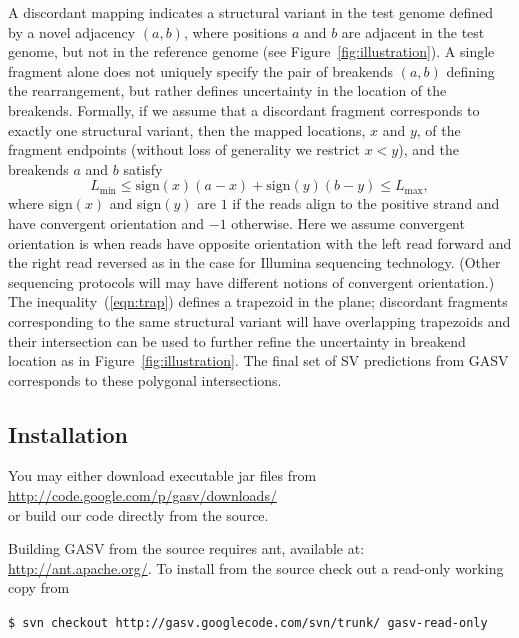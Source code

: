 \documentclass[11pt]{article}
\begin{document}
A discordant mapping indicates a structural variant in the test genome defined by a novel adjacency $(a,b)$, where positions $a$ and $b$ are adjacent in the test genome, but not in the reference genome (see Figure~\ref{fig:illustration}). A single fragment alone does not uniquely specify the pair of breakends $(a,b)$ defining the rearrangement, but rather defines uncertainty in the location of the breakends. Formally, if we assume that a discordant fragment corresponds to exactly one structural variant, then the mapped locations, $x$ and $y$, of the fragment endpoints (without loss of generality we restrict $x < y$), and the breakends $a$ and $b$ satisfy
\begin{equation}
L_{\min} \le \text{sign}(x)(a - x) + \text{sign}(y) (b - y) \le L_{\max}, \nonumber
\label{eqn:trap}
\end{equation}
\noindent where sign$(x)$ and sign$(y)$ are $1$ if the reads align to the positive strand and have convergent orientation and $-1$ otherwise. Here we assume convergent orientation is when reads have opposite orientation with the left read forward and the right read reversed as in the case for Illumina sequencing technology. (Other sequencing protocols will may have different notions of convergent orientation.)  The inequality~(\ref{eqn:trap}) defines a trapezoid in the plane; discordant fragments corresponding to the same structural variant will have overlapping trapezoids and their intersection can be used to further refine the uncertainty in breakend location as in Figure~\ref{fig:illustration}. The final set of SV predictions from GASV corresponds to these polygonal intersections. 


\subsection{Installation}

You may either download executable jar files from\\

\noindent \url{http://code.google.com/p/gasv/downloads/}\\

\noindent or build our code directly from the source.  

Building GASV from the source requires ant, available at: \url{http://ant.apache.org/}. To install from the source check out a read-only working copy from 

\begin{framed}
{\normalsize
\noindent \texttt{\$ svn checkout http://gasv.googlecode.com/svn/trunk/ gasv-read-only}
}
\end{framed}
\end{document}
